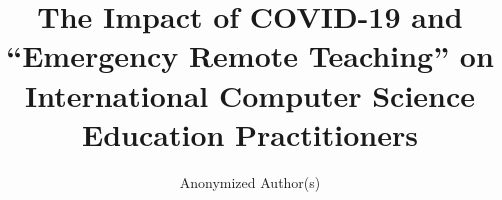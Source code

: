 \documentclass[sigconf]{acmart}
\begin{document}
\title[The International Impact of COVID-19 on CS Education]{The
  Impact of COVID-19 and ``Emergency Remote Teaching'' on
  International Computer Science Education Practitioners}


\author{Anonymized Author(s)}





\end{document}
